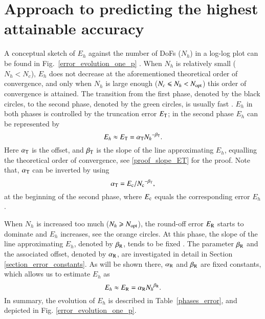 \documentclass[review,3p]{elsarticle}
\begin{document}
\section{Approach to predicting the highest attainable accuracy}      \label{section_behaviour_discretization_error_and_prediction}

A conceptual sketch of $E_h$ against the number of DoFs ($N_h$) in a log-log plot can be found in Fig.~\ref{error_evolution_one_p} \cite{butcher2016numerical}.
When $N_h$ is relatively small ($N_h<N_c$), $E_h$ does not decrease at the aforementioned theoretical order of convergence, and only when $N_h$ is large enough ($N_c \leqslant N_h < N_{\rm opt}$) this order of convergence is attained.  The transition from the first phase, denoted by the black circles, to the second phase, denoted by the green circles, is usually fast \cite{butcher2016numerical}. $E_h$ in both phases is controlled by the truncation error $E_{\rm T}$; in the second phase $E_h$ can be represented by 
\begin{equation}
 E_{h} \approx E_{\rm T} = \alpha_{\rm T}{N_{h}}^{-\beta_{\rm T}}.		\label{formula_truncation_error}
\end{equation}
Here $\alpha_{\rm T}$ is the offset, and $\beta_{\rm T}$ is the slope of the line approximating $E_h$, equalling the theoretical order of convergence, see \ref{proof_slope_ET} for the proof. Note that, $\alpha_{\rm T}$ can be inverted by using 
\begin{equation}
 \alpha_{\rm T} = {E_{\rm c}}/{N_{\rm c}}^{- \beta_{\rm T}},		\label{formula_offset_truncation_error}
\end{equation}
at the beginning of the second phase, where $E_{\rm c}$ equals the corresponding error $E_h$.

When $N_h$ is increased too much ($N_h \geqslant N_{\rm opt}$), the round-off error $E_{\rm R}$ starts to dominate and $E_h$ increases, see the orange circles. At this phase, the slope of the line approximating $E_h$, denoted by $\beta_{\rm R}$, tends to be fixed \cite{Babuska2018Roundoff,WalterFrei}. The parameter $\beta_{\rm R}$ and the associated offset, denoted by $\alpha_{\rm R}$, are investigated in detail in Section \ref{section_error_constants}. As will be shown there, $\alpha_{\rm R}$ and $\beta_{\rm R}$ are fixed constants, which allows us to estimate $E_h$ as
\begin{equation}
 E_{h} \approx E_{\rm R} = \alpha_{\rm R}{N_{h}}^{\beta_{\rm R}}.		\label{formula_round_off_error}
\end{equation}
In summary, the evolution of $E_h$ is described in Table~\ref{phases_error}, and depicted in Fig. \ref{error_evolution_one_p}.
\end{document}
